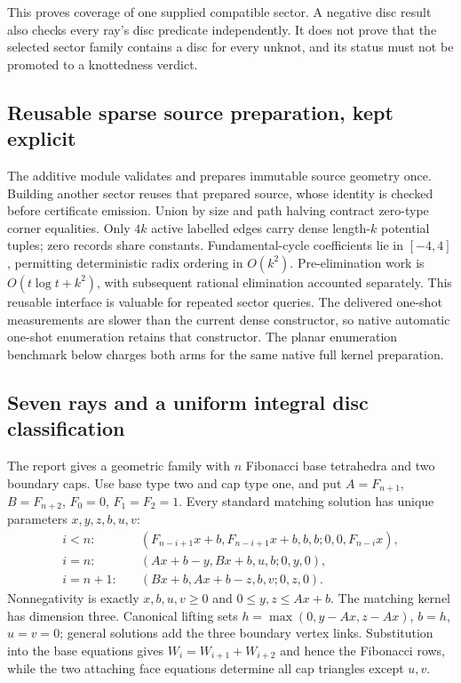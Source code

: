 This proves coverage of one supplied compatible sector. A negative disc
result also checks every ray's disc predicate independently. It does not
prove that the selected sector family contains a disc for every unknot,
and its status must not be promoted to a knottedness verdict.

\subsection{Reusable sparse source preparation, kept explicit}

The additive  module validates and prepares immutable
source geometry once. Building another sector reuses that prepared source,
whose identity is checked before certificate emission. Union by size and
path halving contract zero-type corner equalities. Only $4k$ active labelled
edges carry dense length-$k$ potential tuples; zero records share constants.
Fundamental-cycle coefficients lie in $[-4,4]$, permitting deterministic
radix ordering in $O(k^2)$. Pre-elimination work is
$O(t\log t+k^2)$, with subsequent rational elimination accounted separately.
This reusable interface is valuable for repeated sector queries.
The delivered one-shot measurements are slower than the current dense
constructor, so native automatic one-shot enumeration retains that
constructor. The planar enumeration benchmark below charges both arms
for the same native full kernel preparation.

\subsection{Seven rays and a uniform integral disc classification}

The report gives a geometric family with $n$ Fibonacci base tetrahedra
and two boundary caps. Use base type two and cap type one, and put
$A=F_{n+1}$, $B=F_{n+2}$, $F_0=0$, $F_1=F_2=1$.
Every standard matching solution has unique parameters $x,y,z,b,u,v$:
\begin{align*}
 i<n:\quad &(F_{n-i+1}x+b,F_{n-i+1}x+b,b,b;0,0,F_{n-i}x),\\
 i=n:\quad &(Ax+b-y,Bx+b,u,b;0,y,0),\\
 i=n+1:\quad &(Bx+b,Ax+b-z,b,v;0,z,0).
\end{align*}
Nonnegativity is exactly $x,b,u,v\ge0$ and $0\le y,z\le Ax+b$.
The matching kernel has dimension three. Canonical lifting sets
$h=\max(0,y-Ax,z-Ax)$, $b=h$, $u=v=0$; general solutions add the three
boundary vertex links. Substitution into the base equations gives
$W_i=W_{i+1}+W_{i+2}$ and hence the Fibonacci rows, while the two attaching
face equations determine all cap triangles except $u,v$.

